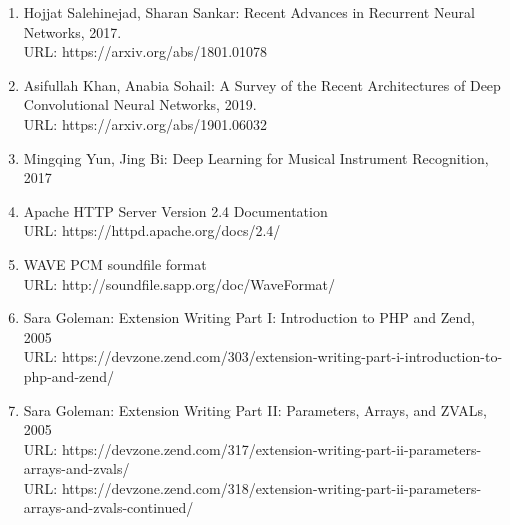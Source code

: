 \documentclass[14pt,a4paper]{article}
\begin{document}
\begin{enumerate}
\item Hojjat Salehinejad, Sharan Sankar: Recent Advances in Recurrent Neural Networks, 2017. \\
URL: https://arxiv.org/abs/1801.01078
\item Asifullah Khan, Anabia Sohail: A Survey of the Recent Architectures of Deep Convolutional Neural Networks, 2019. \\
URL: https://arxiv.org/abs/1901.06032
\item Mingqing Yun, Jing Bi: Deep Learning for Musical Instrument Recognition, 2017
\item Apache HTTP Server Version 2.4 Documentation \\
URL: https://httpd.apache.org/docs/2.4/
\item WAVE PCM soundfile format \\
URL: http://soundfile.sapp.org/doc/WaveFormat/
\item Sara Goleman: Extension Writing Part I: Introduction to PHP and Zend, 2005 \\
URL: https://devzone.zend.com/303/extension-writing-part-i-introduction-to-php-and-zend/
\item Sara Goleman: Extension Writing Part II: Parameters, Arrays, and ZVALs, 2005 \\
URL: https://devzone.zend.com/317/extension-writing-part-ii-parameters-arrays-and-zvals/ \\
URL: https://devzone.zend.com/318/extension-writing-part-ii-parameters-arrays-and-zvals-continued/
\end{enumerate}
\end{document}
